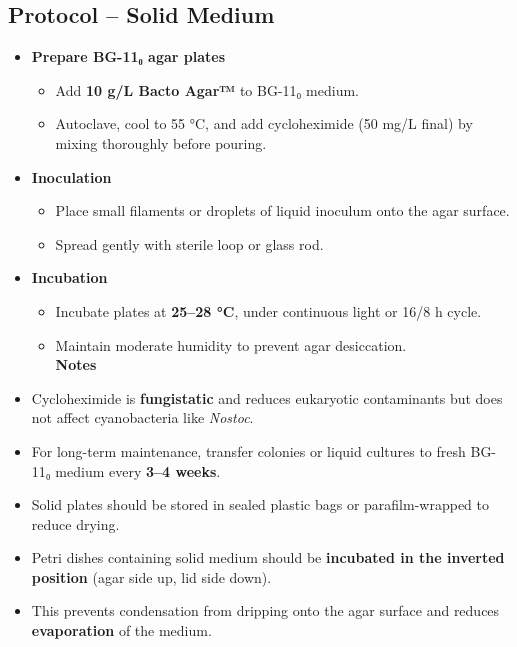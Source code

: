 \documentclass[
  11pt,
]{article}
\providecommand{\tightlist}{%
  \setlength{\itemsep}{0pt}\setlength{\parskip}{0pt}}
\begin{document}
\subsection{Protocol -- Solid Medium}\label{protocol-solid-medium}

\begin{itemize}
\tightlist
\item
  \textbf{Prepare BG-11₀ agar plates}

  \begin{itemize}
  \tightlist
  \item
    Add \textbf{10 g/L Bacto Agar™} to BG-11₀ medium.\\
  \item
    Autoclave, cool to 55 °C, and add cycloheximide (50 mg/L final) by
    mixing thoroughly before pouring.\\
  \end{itemize}
\item
  \textbf{Inoculation}

  \begin{itemize}
  \tightlist
  \item
    Place small filaments or droplets of liquid inoculum onto the agar
    surface.\\
  \item
    Spread gently with sterile loop or glass rod.\\
  \end{itemize}
\item
  \textbf{Incubation}

  \begin{itemize}
  \tightlist
  \item
    Incubate plates at \textbf{25--28 °C}, under continuous light or
    16/8 h cycle.\\
  \item
    Maintain moderate humidity to prevent agar desiccation.\\
    \textbf{Notes}
  \end{itemize}
\item
  Cycloheximide is \textbf{fungistatic} and reduces eukaryotic
  contaminants but does not affect cyanobacteria like \emph{Nostoc}.\\
\item
  For long-term maintenance, transfer colonies or liquid cultures to
  fresh BG-11₀ medium every \textbf{3--4 weeks}.\\
\item
  Solid plates should be stored in sealed plastic bags or
  parafilm-wrapped to reduce drying.\\
\item
  Petri dishes containing solid medium should be \textbf{incubated in
  the inverted position} (agar side up, lid side down).\\
\item
  This prevents condensation from dripping onto the agar surface and
  reduces \textbf{evaporation} of the medium.
\end{itemize}
\end{document}
